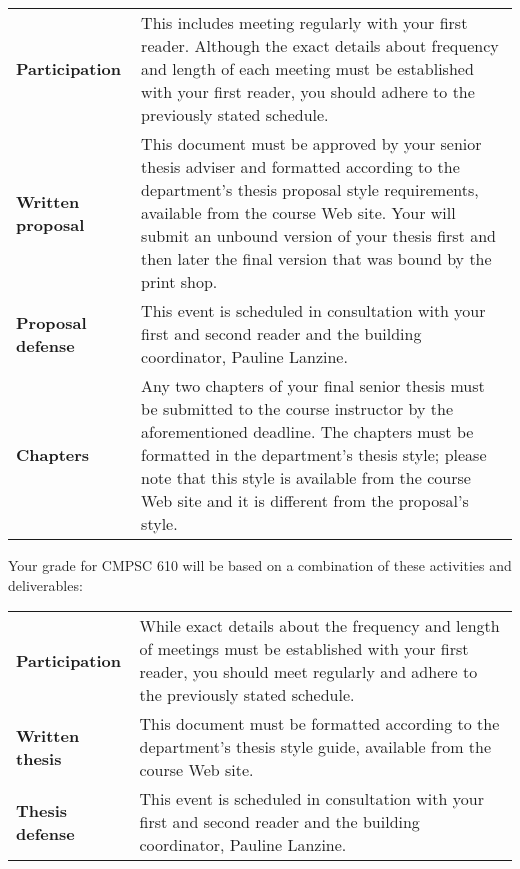 % 

\begin{center}
\begin{tabular}{lp{4in}}

\bf Participation & This includes meeting regularly with your first reader. Although the exact details about frequency and
length of each meeting must be established with your first reader, you should adhere to the previously stated schedule.
\\[.1in]

\bf Written proposal & This document must be approved by your senior thesis adviser and formatted according to the 
department's thesis proposal style requirements, available from the course Web site. Your will submit an unbound version
of your thesis first and then later the final version that was bound by the print shop. \\[.1in]

\bf Proposal defense & This event is scheduled in consultation with your first and second reader and the building
coordinator, Pauline Lanzine. \\[.1in]

\bf Chapters & Any two chapters of your final senior thesis must be submitted to the course instructor by the
aforementioned deadline.  The chapters must be formatted in the department's thesis style; please note that
this style is available from the course Web site and it is different from the proposal's style.

\end{tabular}
\end{center}

\noindent
Your grade for CMPSC 610 will be based on a combination of these activities and deliverables:
\begin{center}
\begin{tabular}{lp{4in}}
\bf Participation & While exact details about the frequency and length of meetings must be established with your first
reader, you should meet regularly and adhere to the previously stated schedule. \\[.1in]

\bf Written thesis & This document must be formatted according to the department's thesis style guide, available from
the course Web site. \\[.1in]

\bf Thesis defense & This event is scheduled in consultation with your first and second reader and the building
coordinator, Pauline Lanzine. \\[.1in]

% 
\end{tabular}
\end{center}

